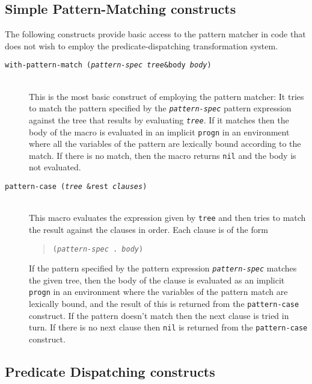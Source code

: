 \documentclass[a4paper,11pt]{scrartcl}
\begin{document}
\subsection{Simple Pattern-Matching constructs}
\label{sec:simple}

The following constructs provide basic access to the pattern matcher
in code that does not wish to employ the predicate-dispatching
transformation system.

\begin{description}
\item[\texttt{with-pattern-match
    (\textsl{pattern-spec} \textsl{tree}\&body \textsl{body})}]
  \hspace{2cm}\\[2ex]
  This is the most basic construct of employing the pattern matcher:
  It tries to match the pattern specified by the
  \texttt{\textsl{pattern-spec}} pattern expression against the tree
  that results by evaluating \texttt{\textsl{tree}}.  If it matches
  then the body of the macro is evaluated in an implicit
  \texttt{progn} in an environment where all the variables of the
  pattern are lexically bound according to the match.  If there is no
  match, then the macro returns \texttt{nil} and the body is not
  evaluated.
\item[\texttt{pattern-case (\textsl{tree} \&rest \textsl{clauses})}]
  \hspace{2cm}\\[2ex]
  This macro evaluates the expression given by \texttt{tree} and then
  tries to match the result against the clauses in order.  Each clause
  is of the form 
  \begin{quote}
    \texttt{(\textsl{pattern-spec} . \textsl{body})}
  \end{quote}
  If the pattern specified by the pattern expression
  \texttt{\textsl{pattern-spec}} matches the given tree, then the body
  of the clause is evaluated as an implicit \texttt{progn} in an
  environment where the variables of the pattern match are lexically
  bound, and the result of this is returned from the
  \texttt{pattern-case} construct.  If the pattern doesn't match then
  the next clause is tried in turn.  If there is no next clause then
  \texttt{nil} is returned from the \texttt{pattern-case} construct.
\end{description}


\subsection{Predicate Dispatching constructs}
\label{sec:pred}
\end{document}
